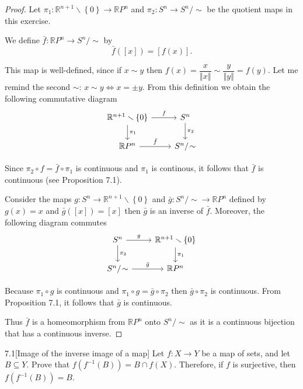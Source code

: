 \begin{proof}
    Let \( \pi_{1}: \mathbb{R}^{n+1}\smallsetminus \left\{0\right\} \to \mathbb{R}P^{n} \) and \( \pi_{2}: S^{n} \to S^{n}/\!\sim \) be the quotient maps in this exercise.

    We define \( \bar{f}: \mathbb{R}P^{n} \to S^{n}/\!\sim \) by
    \[
        \bar{f}([x]) = [f(x)].
    \]

    This map is well-defined, since if \( x \sim y \) then \( f(x) = \dfrac{x}{\left\Vert x\right\Vert} \sim \dfrac{y}{\left\Vert y\right\Vert} = f(y) \). Let me remind the second \( \sim \): \( x \sim y \Longleftrightarrow x = \pm y \). From this definition we obtain the following commutative diagram
    \[
        \begin{tikzcd}
            \mathbb{R}^{n+1}\smallsetminus \left\{0\right\} \arrow{r}{f} \arrow{d}{\pi_{1}} & S^{n} \arrow{d}{\pi_{2}} \\
            \mathbb{R}P^{n} \arrow{r}{\bar{f}}                                & S^{n}/\!\sim
        \end{tikzcd}
    \]

    Since \( \pi_{2} \circ f = \bar{f} \circ \pi_{1} \) is continuous and \( \pi_{1} \) is continous, it follows that \( \bar{f} \) is continuous (see Proposition 7.1).

    Consider the maps \( g: S^{n} \to \mathbb{R}^{n+1}\smallsetminus\left\{0\right\} \) and \( \bar{g}: S^{n}/\!\sim \to \mathbb{R}P^{n} \) defined by \( g(x) = x \) and \( \bar{g}([x]) = [x] \) then \( \bar{g} \) is an inverse of \( \bar{f} \). Moreover, the following diagram commutes
    \[
        \begin{tikzcd}
            S^{n} \arrow{r}{g} \arrow{d}{\pi_{2}} & \mathbb{R}^{n+1}\smallsetminus\left\{0\right\} \arrow{d}{\pi_{1}} \\
            S^{n}/\!\sim \arrow{r}{\bar{g}}         & \mathbb{R}P^{n}
        \end{tikzcd}
    \]

    Because \( \pi_{1} \circ g \) is continuous and \( \pi_{1} \circ g = \bar{g} \circ \pi_{2} \) then \( \bar{g} \circ \pi_{2} \) is continuous. From Proposition 7.1, it follows that \( \bar{g} \) is continuous.

    Thus \( \bar{f} \) is a homeomorphism from \( \mathbb{R}P^{n} \) onto \( S^{n}/\!\sim \) as it is a continuous bijection that has a continuous inverse.
\end{proof}

\begin{problem}{7.1}[Image of the inverse image of a map]
Let \( f: X \to Y \) be a map of sets, and let \( B \subseteq Y \). Prove that \( f(f^{-1}(B)) = B \cap f(X) \). Therefore, if \( f \) is surjective, then \( f(f^{-1}(B)) = B \).
\end{problem}

